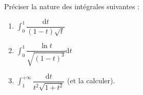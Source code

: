 Préciser la nature des intégrales suivantes :
\begin{enumerate}
\item $\displaystyle\int_0^1\dfrac{\mathrm{d}t}{(1-t)\sqrt t}$
\item  $\displaystyle\int_0^1\dfrac{\ln t}{\sqrt{(1-t)^3}}\mathrm{d}t$
\item  $\displaystyle\int_1^{+\infty}\dfrac{\mathrm{d}t}{t^2\sqrt{1+t^2}}$ (et la calculer).
\end{enumerate}
